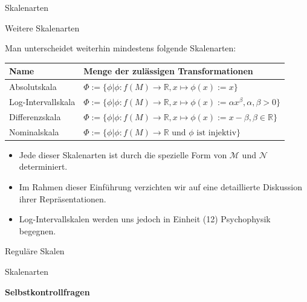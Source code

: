\documentclass[
  8pt,
  ignorenonframetext,
]{beamer}
\providecommand{\tightlist}{%
  \setlength{\itemsep}{0pt}\setlength{\parskip}{0pt}}
\begin{document}
\begin{frame}{Skalenarten}
\protect\hypertarget{skalenarten-6}{}
\small

Weitere Skalenarten

\footnotesize

Man unterscheidet weiterhin mindestens folgende Skalenarten:

\center
\begin{tabular}{ll}
Name                & Menge der zulässigen Transformationen                                                                     \\\hline
Absolutskala        & $\Phi := \{\phi| \phi : f(M) \to \mathbb{R}, x \mapsto \phi(x) := x\}$                                    \\
Log-Intervallskala  & $\Phi := \{\phi| \phi : f(M) \to \mathbb{R}, x \mapsto \phi(x) := \alpha x^{\beta}, \alpha,\beta >0\}$    \\
Differenzskala      & $\Phi := \{\phi| \phi : f(M) \to \mathbb{R}, x \mapsto \phi(x) := x - \beta, \beta \in \mathbb{R}\}$      \\
Nominalskala        & $\Phi := \{\phi| \phi : f(M) \to \mathbb{R} \mbox{ und } \phi \mbox{ ist injektiv}\}$                     \\\hline
\end{tabular}

\begin{itemize}
\tightlist
\item
  Jede dieser Skalenarten ist durch die spezielle Form von
  \(\mathcal{M}\) und \(\mathcal{N}\) determiniert.
\item
  Im Rahmen dieser Einführung verzichten wir auf eine detaillierte
  Diskussion ihrer Repräsentationen.
\item
  Log-Intervallskalen werden uns jedoch in Einheit (12) Psychophysik
  begegnen.
\end{itemize}
\end{frame}

\begin{frame}{}
\protect\hypertarget{section-5}{}
\vfill
\Large
{}

Reguläre Skalen

Skalenarten

\textbf{Selbstkontrollfragen} \vfill
\end{frame}
\end{document}
